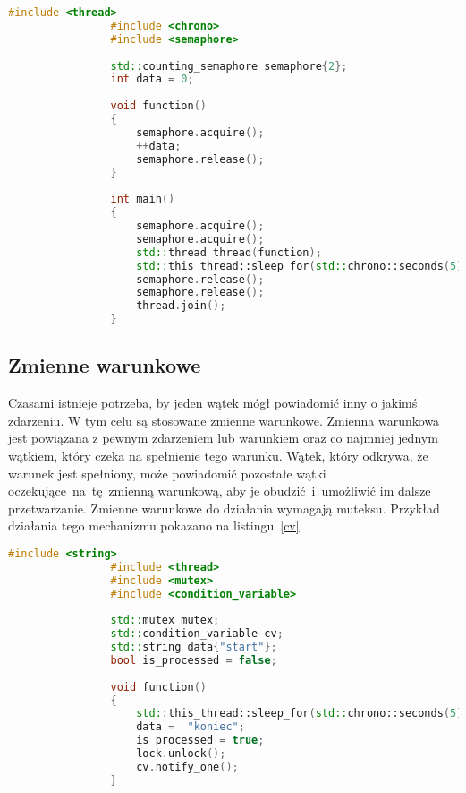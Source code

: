 {{        \begin{lstlisting}[caption=Przykład użycia semaforów w języku C++, language=C++, label=semaphore]
                #include <thread>
                #include <chrono>
                #include <semaphore>
                 
                std::counting_semaphore semaphore{2};
                int data = 0;
                
                void function()
                {
                    semaphore.acquire();
                    ++data;
                    semaphore.release();
                }
                 
                int main()
                {
                    semaphore.acquire();
                    semaphore.acquire();
                    std::thread thread(function);
                    std::this_thread::sleep_for(std::chrono::seconds(5));
                    semaphore.release();
                    semaphore.release();
                    thread.join();
                }
        \end{lstlisting}
    }
    \subsection{Zmienne warunkowe}
    {
        Czasami istnieje potrzeba, by jeden wątek mógł powiadomić inny o jakimś zdarzeniu. W tym celu są stosowane zmienne warunkowe. Zmienna warunkowa jest powiązana z pewnym zdarzeniem lub warunkiem oraz co najmniej jednym wątkiem, który czeka na spełnienie tego warunku. Wątek, który odkrywa, że warunek jest spełniony, może powiadomić pozostałe wątki oczekujące~na~tę~zmienną warunkową, aby je obudzić~i~umożliwić im dalsze przetwarzanie. Zmienne warunkowe do działania wymagają muteksu. Przykład działania tego mechanizmu pokazano na listingu~\ref{cv}.

        \begin{lstlisting}[caption=Przykład użycia zmiennych warunkowych w języku C++, language=C++, label=cv]
                #include <string>
                #include <thread>
                #include <mutex>
                #include <condition_variable>
                 
                std::mutex mutex;
                std::condition_variable cv;
                std::string data{"start"};
                bool is_processed = false;
                 
                void function()
                {
                    std::this_thread::sleep_for(std::chrono::seconds(5));
                    data =  "koniec";
                    is_processed = true;
                    lock.unlock();
                    cv.notify_one();
                }
                 

\end{lstlisting}}}
